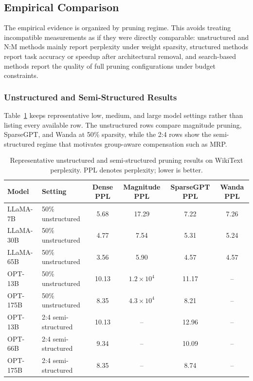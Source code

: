 \subsection{Empirical Comparison}
\label{subsec:empirical_comparison}

The empirical evidence is organized by pruning regime. This avoids treating incompatible measurements as if they were directly comparable: unstructured and N:M methods mainly report perplexity under weight sparsity, structured methods report task accuracy or speedup after architectural removal, and search-based methods report the quality of full pruning configurations under budget constraints.

\subsubsection{Unstructured and Semi-Structured Results}

Table~\ref{tab:unsupported_comparison} keeps representative low, medium, and large model settings rather than listing every available row. The unstructured rows compare magnitude pruning, SparseGPT, and Wanda at 50\% sparsity, while the 2:4 rows show the semi-structured regime that motivates group-aware compensation such as MRP.

\begin{table}[H]
	\centering
	\caption{Representative unstructured and semi-structured pruning results on WikiText perplexity. PPL denotes perplexity; lower is better.}
	\label{tab:unsupported_comparison}
	\begin{tabular}{@{}llcccc@{}}
		\toprule
		\textbf{Model} & \textbf{Setting} & \textbf{Dense PPL} & \textbf{Magnitude PPL} & \textbf{SparseGPT PPL} & \textbf{Wanda PPL} \\
		\midrule
		LLaMA-7B  & 50\% unstructured & 5.68 & 17.29 & 7.22 & 7.26 \\
		LLaMA-30B & 50\% unstructured & 4.77 & 7.54  & 5.31 & 5.24 \\
		LLaMA-65B & 50\% unstructured & 3.56 & 5.90  & 4.57 & 4.57 \\
		\midrule
		OPT-13B   & 50\% unstructured & 10.13 & $1.2{\times}10^4$ & 11.17 & -- \\
		OPT-175B  & 50\% unstructured & 8.35  & $4.3{\times}10^4$ & 8.21  & -- \\
		\midrule
		OPT-13B   & 2:4 semi-structured & 10.13 & -- & 12.96 & -- \\
		OPT-66B   & 2:4 semi-structured & 9.34  & -- & 10.09 & -- \\
		OPT-175B  & 2:4 semi-structured & 8.35  & -- & 8.74  & -- \\
		\bottomrule
	\end{tabular}
\end{table}

